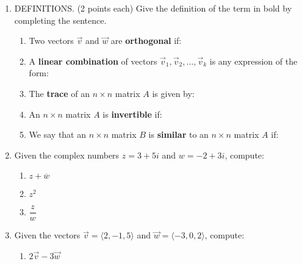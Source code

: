 \documentclass[12pt]{article}
\newcommand{\points}[1]{\marginpar{\hspace{24pt}[#1]}}
\begin{document}
\begin{enumerate}
\item DEFINITIONS. (2 points each) Give the definition of the term in bold by completing the sentence. 

\begin{enumerate}
 \item Two vectors $\vec{v}$ and $\vec{w}$ are \textbf{orthogonal} if: 

\vspace{1.3in}

 \item A \textbf{linear combination} of vectors $\vec{v}_1, \vec{v}_2,\ldots, \vec{v}_k$ is any expression of the form:

\vspace{1.3in}

 \item The \textbf{trace} of an $n\times n$ matrix $A$ is given by:

\vspace{1.3in}

 \item An $n\times n$ matrix $A$ is \textbf{invertible} if:

\vspace{1.3in}

 \item We say that an $n\times n$ matrix $B$ is \textbf{similar} to an $n\times n$ matrix $A$ if:


 
\end{enumerate}
\newpage

\item Given the complex numbers $z=3+5i$ and $w=-2+3i$, compute:
\begin{enumerate}
 \item $z+\overline{w}$ \points{2}

\vspace{0.75in}

 \item $z^2$ \points{2}

\vspace{1.1in}

 \item $\dfrac{z}{w}$ \points{3}

\vspace{1.5in}

\end{enumerate}

\item Given the vectors $\vec{v} = \langle 2, -1, 5\rangle$ and $\vec{w} = \langle -3, 0, 2\rangle$, compute:
\begin{enumerate}
 \item $2\vec{v}-3\vec{w}$ \points{2}


\end{enumerate}
\end{enumerate}
\end{document}
